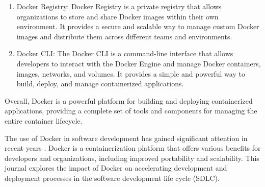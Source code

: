 \begin{enumerate}
    \item Docker Registry: Docker Registry is a private registry that allows organizations to store and share Docker images within their own environment. It provides a secure and scalable way to manage custom Docker images and distribute them across different teams and environments.
    \item Docker CLI: The Docker CLI is a command-line interface that allows developers to interact with the Docker Engine and manage Docker containers, images, networks, and volumes. It provides a simple and powerful way to build, deploy, and manage containerized applications.
\end{enumerate}

Overall, Docker is a powerful platform for building and deploying containerized applications, providing a complete set of tools and components for managing the entire container lifecycle.

The use of Docker in software development has gained significant attention in recent years \cite{merkel2014docker,boettiger2015introduction}. Docker is a containerization platform that offers various benefits for developers and organizations, including improved portability and scalability. This journal explores the impact of Docker on accelerating development and deployment processes in the software development life cycle (SDLC). 
